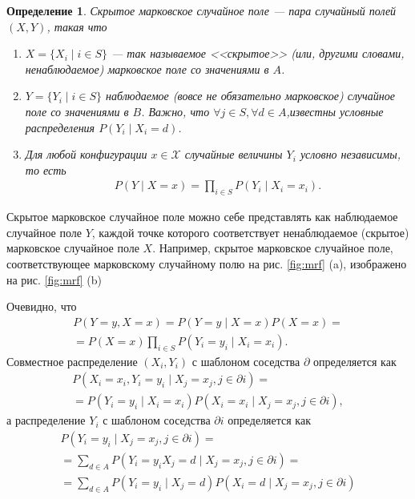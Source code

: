 \documentclass[12pt]{article}
\newtheorem{dfn}{Определение}
\begin{document}
\begin{dfn}
Скрытое марковское случайное поле --- пара случайный полей $(X, Y)$, такая что 
\begin{enumerate}
\item $X = \{ X_i \mid i \in S \}$ --- так называемое <<скрытое>> (или, другими словами, ненаблюдаемое) марковское поле со значениями в $A$.
\item  $Y = \{ Y_i \mid i \in S \}$  наблюдаемое (вовсе не обязательно марковское) случайное поле со значениями в $B$. Важно, что $\forall j \in S, \forall d \in A$,известны условные распределения $P(Y_i \mid X_i = d)$.
\item Для любой конфигурации $x\in \mathcal{X}$ случайные величины $Y_i$ условно независимы, то есть
\begin{gather*}
P(Y\mid X = x) = \prod\limits_{i \in S} P(Y_i\mid X_i = x_i).
\end{gather*}
\end{enumerate}
\end{dfn}
Скрытое марковское случайное поле можно себе представлять как
наблюдаемое случайное поле $Y$, каждой точке которого соответствует ненаблюдаемое (скрытое) марковское случайное поле $X$. Например, скрытое марковское случайное поле, соответствующее марковскому
случайному полю на рис. \ref{fig:mrf} (a), изображено на рис. \ref{fig:mrf} (b)

Очевидно, что 
\begin{gather*}
P(Y = y, X = x) = P(Y = y\mid X = x)P(X = x) = \\
= P(X = x)\prod\limits_{i \in S} P(Y_i = y_i\mid X_i = x_i).
\end{gather*}
Совместное распределение $(X_i, Y_i)$ с шаблоном соседства $\partial$ определяется как
\begin{gather*}
P(X_i = x_i, Y_i = y_i \mid X_j = x_j, j \in \partial i) = \\
= P(Y_i = y_i\mid X_i = x_i) P(X_i = x_i \mid X_j = x_j, j \in \partial i),
\end{gather*}
а распределение $Y_i$ с шаблоном соседства $\partial i$ определяется как
\begin{gather*}
P(Y_i = y_i \mid X_j = x_j, j \in \partial i) = \\
=\sum\limits_{d\in A} P(Y_i = y_i X_j = d \mid X_j = x_j, j \in \partial i) = \\
= \sum\limits_{d\in A} P(Y_i = y_i \mid X_j = d) P(X_i = d\mid X_j = x_j, j \in \partial i)
\end{gather*}
\end{document}
